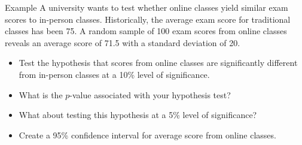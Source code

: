 \documentclass{./../div_teaching_slides}
\begin{document}
\begin{frame}{Example}
\vspace{-0.1cm} \small
A university wants to test whether online classes yield similar exam scores to in-person classes. Historically, the average exam score for traditional classes has been 75. A random sample of 100 exam scores from online classes reveals an average score of 71.5 with a standard deviation of 20. \\  \vspace{0.1cm}
\begin{itemize}
  \item Test the hypothesis that scores from online classes are significantly different from in-person classes at a 10\% level of significance.
  \item What is the $p$-value associated with your hypothesis test?
  \item What about testing this hypothesis at a 5\% level of significance?
  \item Create a 95\% confidence interval for average score from online classes.
\end{itemize}

\end{frame}

\begin{frame}
\vfill \centering \huge
{}
\vfill
\end{frame}
\end{document}
